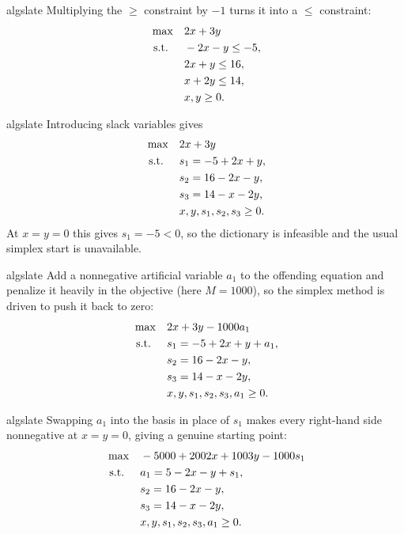\begin{steppanel}{algslate}
 Multiplying the $\ge$ constraint by $-1$ turns it into a $\le$ constraint:
\[
\begin{aligned}
\max\quad & 2x + 3y \\
\mbox{ s.t. }\quad & -2x - y \leq -5, \\
& 2x + y \leq 16, \\
& x + 2y \leq 14, \\
& x, y \geq 0.
\end{aligned}
\]
\end{steppanel}

\begin{steppanel}{algslate}
 Introducing slack variables gives
\[
\begin{aligned}
\max\quad & 2x + 3y \\
\mbox{ s.t. }\quad & s_1 = -5 + 2x + y,\\
& s_2 = 16 - 2x - y,\\
& s_3 = 14 - x - 2y,\\
& x, y, s_1, s_2, s_3 \ge 0.
\end{aligned}
\]
At $x=y=0$ this gives $s_1=-5<0$, so the dictionary is infeasible and the usual simplex start is unavailable.
\end{steppanel}

\begin{steppanel}{algslate}
 Add a nonnegative artificial variable $a_1$ to the offending equation and penalize it heavily in the objective (here $M=1000$), so the simplex method is driven to push it back to zero:
\[
\begin{aligned}
\max\quad & 2x + 3y - 1000a_1 \\
\mbox{ s.t. }\quad & s_1 = -5 + 2x + y + a_1,\\
& s_2 = 16 - 2x - y,\\
& s_3 = 14 - x - 2y,\\
& x, y, s_1, s_2, s_3, a_1 \ge 0.
\end{aligned}
\]
\end{steppanel}

\begin{steppanel}{algslate}
 Swapping $a_1$ into the basis in place of $s_1$ makes every right-hand side nonnegative at $x=y=0$, giving a genuine starting point:
\[
\begin{aligned}
\max\quad & -5000 + 2002x + 1003y - 1000s_1 \\
\mbox{ s.t. }\quad & a_1 = 5 - 2x - y + s_1,\\
& s_2 = 16 - 2x - y,\\
& s_3 = 14 - x - 2y,\\
& x, y, s_1, s_2, s_3, a_1 \ge 0.
\end{aligned}
\]
\end{steppanel}

